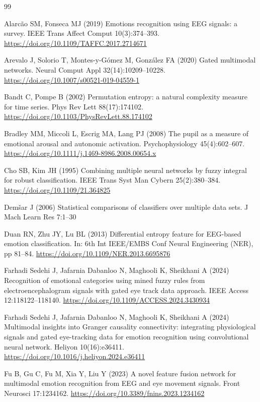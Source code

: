 \begin{thebibliography}{99}

 Alarc\~ao SM, Fonseca MJ (2019) Emotions recognition using EEG signals: a survey. IEEE Trans Affect Comput 10(3):374--393. \url{https://doi.org/10.1109/TAFFC.2017.2714671}

 Arevalo J, Solorio T, Montes-y-G\'omez M, Gonz\'alez FA (2020) Gated multimodal networks. Neural Comput Appl 32(14):10209--10228. \url{https://doi.org/10.1007/s00521-019-04559-1}

 Bandt C, Pompe B (2002) Permutation entropy: a natural complexity measure for time series. Phys Rev Lett 88(17):174102. \url{https://doi.org/10.1103/PhysRevLett.88.174102}

 Bradley MM, Miccoli L, Escrig MA, Lang PJ (2008) The pupil as a measure of emotional arousal and autonomic activation. Psychophysiology 45(4):602--607. \url{https://doi.org/10.1111/j.1469-8986.2008.00654.x}

 Cho SB, Kim JH (1995) Combining multiple neural networks by fuzzy integral for robust classification. IEEE Trans Syst Man Cybern 25(2):380--384. \url{https://doi.org/10.1109/21.364825}

 Dem\v{s}ar J (2006) Statistical comparisons of classifiers over multiple data sets. J Mach Learn Res 7:1--30

 Duan RN, Zhu JY, Lu BL (2013) Differential entropy feature for EEG-based emotion classification. In: 6th Int IEEE/EMBS Conf Neural Engineering (NER), pp 81--84. \url{https://doi.org/10.1109/NER.2013.6695876}

 Farhadi Sedehi J, Jafarnia Dabanloo N, Maghooli K, Sheikhani A (2024) Recognition of emotional categories using mined fuzzy rules from electroencephalogram signals with gated eye track data approach. IEEE Access 12:118122--118140. \url{https://doi.org/10.1109/ACCESS.2024.3430934}

 Farhadi Sedehi J, Jafarnia Dabanloo N, Maghooli K, Sheikhani A (2024) Multimodal insights into Granger causality connectivity: integrating physiological signals and gated eye-tracking data for emotion recognition using convolutional neural network. Heliyon 10(16):e36411. \url{https://doi.org/10.1016/j.heliyon.2024.e36411}

 Fu B, Gu C, Fu M, Xia Y, Liu Y (2023) A novel feature fusion network for multimodal emotion recognition from EEG and eye movement signals. Front Neurosci 17:1234162. \url{https://doi.org/10.3389/fnins.2023.1234162}


\end{thebibliography}
